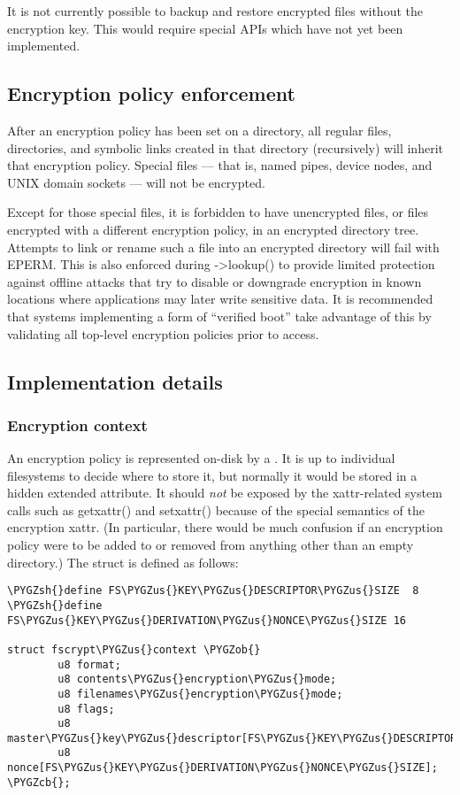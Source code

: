 \documentclass[a4paper,8pt,english]{sphinxmanual}
\def\PYGZus{\char`\_}
\def\PYGZob{\char`\{}
\def\PYGZcb{\char`\}}
\def\PYGZsh{\char`\#}
\begin{document}
It is not currently possible to backup and restore encrypted files
without the encryption key.  This would require special APIs which
have not yet been implemented.


\subsection{Encryption policy enforcement}
\label{filesystems/fscrypt:encryption-policy-enforcement}
After an encryption policy has been set on a directory, all regular
files, directories, and symbolic links created in that directory
(recursively) will inherit that encryption policy.  Special files ---
that is, named pipes, device nodes, and UNIX domain sockets --- will
not be encrypted.

Except for those special files, it is forbidden to have unencrypted
files, or files encrypted with a different encryption policy, in an
encrypted directory tree.  Attempts to link or rename such a file into
an encrypted directory will fail with EPERM.  This is also enforced
during -\textgreater{}lookup() to provide limited protection against offline
attacks that try to disable or downgrade encryption in known locations
where applications may later write sensitive data.  It is recommended
that systems implementing a form of ``verified boot'' take advantage of
this by validating all top-level encryption policies prior to access.


\subsection{Implementation details}
\label{filesystems/fscrypt:implementation-details}

\subsubsection{Encryption context}
\label{filesystems/fscrypt:encryption-context}
An encryption policy is represented on-disk by a .  It is up to individual filesystems to decide where
to store it, but normally it would be stored in a hidden extended
attribute.  It should \emph{not} be exposed by the xattr-related system
calls such as getxattr() and setxattr() because of the special
semantics of the encryption xattr.  (In particular, there would be
much confusion if an encryption policy were to be added to or removed
from anything other than an empty directory.)  The struct is defined
as follows:

\begin{Verbatim}[commandchars=\\\{\}]
\PYGZsh{}define FS\PYGZus{}KEY\PYGZus{}DESCRIPTOR\PYGZus{}SIZE  8
\PYGZsh{}define FS\PYGZus{}KEY\PYGZus{}DERIVATION\PYGZus{}NONCE\PYGZus{}SIZE 16

struct fscrypt\PYGZus{}context \PYGZob{}
        u8 format;
        u8 contents\PYGZus{}encryption\PYGZus{}mode;
        u8 filenames\PYGZus{}encryption\PYGZus{}mode;
        u8 flags;
        u8 master\PYGZus{}key\PYGZus{}descriptor[FS\PYGZus{}KEY\PYGZus{}DESCRIPTOR\PYGZus{}SIZE];
        u8 nonce[FS\PYGZus{}KEY\PYGZus{}DERIVATION\PYGZus{}NONCE\PYGZus{}SIZE];
\PYGZcb{};
\end{Verbatim}
\end{document}
